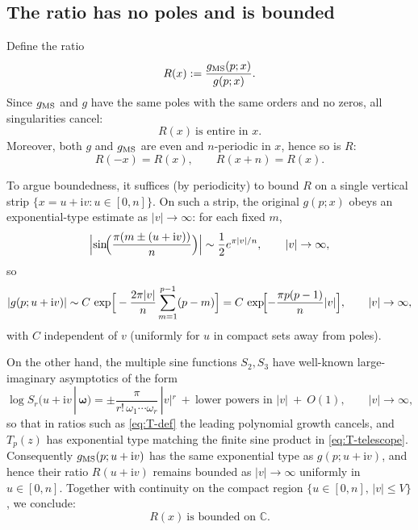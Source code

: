 \documentclass[11pt]{article}
\newcommand{\ii}{\mathrm{i}}
\begin{document}
  \subsection*{The ratio has no poles and is bounded}

  Define the ratio
  \begin{equation}
    R(x):=\frac{g_{\rm MS}(p;x)}{g(p;x)}.
  \end{equation}
  Since $g_{\rm MS}$ and $g$ have the same poles with the same orders and no zeros,
  all singularities cancel:
  \begin{equation}
    \boxed{R(x)\ \text{is entire in }x.}
  \end{equation}
  Moreover, both $g$ and $g_{\rm MS}$ are even and $n$-periodic in $x$, hence so
  is $R$:
  \begin{equation}
    R(-x)=R(x),\qquad R(x+n)=R(x). \label{eq:R-periodic}
  \end{equation}

  To argue boundedness, it suffices (by periodicity) to bound $R$ on a single
  vertical strip $\{x=u+\ii v: u\in[0,n]\}$. On such a strip, the original
  $g(p;x)$ obeys an exponential-type estimate as $|v|\to\infty$: for each fixed $m$,
  \begin{equation}
    \Bigl|\sin\!\Bigl(\frac{\pi(m\pm(u+\ii v))}{n}\Bigr)\Bigr| \sim \frac{1}{2}e^{\pi
    |v|/n}, \qquad |v|\to\infty,
  \end{equation}
  so
  \begin{equation}
    |g(p;u+\ii v)| \sim C\,\exp\!\Big[-\frac{2\pi|v|}{n}\sum_{m=1}^{p-1}(p-m)\Big] = C\,\exp\!\Bigl[-\frac{\pi p(p-1)}{n}|v|\Bigr], \qquad |v|\to\infty, \label{eq:g-asymp}
  \end{equation}
  with $C$ independent of $v$ (uniformly for $u$ in compact sets away from poles).

  On the other hand, the multiple sine functions $S_{2},S_{3}$ have well-known large-imaginary
  asymptotics of the form
  \begin{equation}
    \log S_{r}(u+\ii v\,|\,\boldsymbol{\omega}) = \pm \frac{\pi}{r!\,\omega_{1}\cdots
    \omega_{r}}\,|v|^{r}\ +\ \text{lower powers in }|v| \ +\ O(1), \qquad |v|\to
    \infty,
  \end{equation}
  so that in ratios such as \eqref{eq:T-def} the leading polynomial growth
  cancels, and $T_{p}(z)$ has exponential type matching the finite sine product in
  \eqref{eq:T-telescope}. Consequently $g_{\rm MS}(p;u+\ii v)$ has the same exponential
  type as $g(p;u+\ii v)$, and hence their ratio $R(u+\ii v)$ remains bounded as
  $|v|\to\infty$ uniformly in $u\in[0,n]$. Together with continuity on the compact
  region $\{u\in[0,n],\,|v|\le V\}$, we conclude:
  \begin{equation}
    \boxed{R(x)\ \text{is bounded on }\mathbb{C}.}
  \end{equation}
\end{document}
